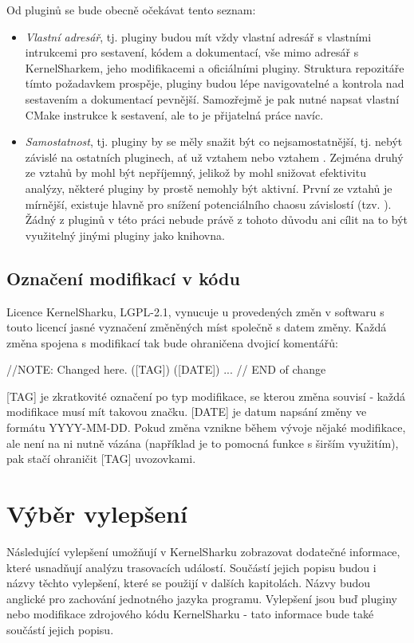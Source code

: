 Od pluginů se bude obecně očekávat tento seznam:
\begin{itemize}
    \item \emph{Vlastní adresář}, tj. pluginy budou mít vždy vlastní adresář s vlastními intrukcemi pro sestavení, kódem a dokumentací, vše mimo adresář s KernelSharkem, jeho modifikacemi a oficiálními pluginy. Struktura repozitáře tímto požadavkem prospěje, pluginy budou lépe navigovatelné a kontrola nad sestavením a dokumentací pevnější. Samozřejmě je pak nutné napsat vlastní CMake instrukce k sestavení, ale to je přijatelná práce navíc.
    \item \emph{Samostatnost}, tj. pluginy by se měly snažit být co nejsamostatnější, tj. nebýt závislé na ostatních pluginech, ať už vztahem  nebo vztahem . Zejména druhý ze vztahů by mohl být nepříjemný, jelikož by mohl snižovat efektivitu analýzy, některé pluginy by prostě nemohly být aktivní. První ze vztahů je mírnější, existuje hlavně pro snížení potenciálního chaosu závislostí (tzv. ). Žádný z pluginů v této práci nebude právě z tohoto důvodu ani cílit na to být využitelný jinými pluginy jako knihovna.
\end{itemize}

\subsection{Označení modifikací v kódu}
\label{comment-style}
Licence KernelSharku, LGPL-2.1, vynucuje u provedených změn v softwaru s touto licencí jasné vyznačení změněných míst společně s datem změny. Každá změna spojena s modifikací tak bude ohraničena dvojicí komentářů:
\begin{code}
    //NOTE: Changed here. ([TAG]) ([DATE])
    ...
    // END of change
\end{code}
[TAG] je zkratkovité označení po typ modifikace, se kterou změna souvisí - každá modifikace musí mít takovou značku. [DATE] je datum napsání změny ve formátu YYYY-MM-DD. Pokud změna vznikne během vývoje nějaké modifikace, ale není na ni nutně vázána (například je to pomocná funkce s širším využitím), pak stačí ohraničit [TAG] uvozovkami.

\section{Výběr vylepšení}
Následující vylepšení umožňují v KernelSharku zobrazovat dodatečné informace, které usnadňují analýzu trasovacích událostí. Součástí jejich popisu budou i názvy těchto vylepšení, které se použijí v dalších kapitolách. Názvy budou anglické pro zachování jednotného jazyka programu. Vylepšení jsou buď pluginy nebo modifikace zdrojového kódu KernelSharku - tato informace bude také součástí jejich popisu.

